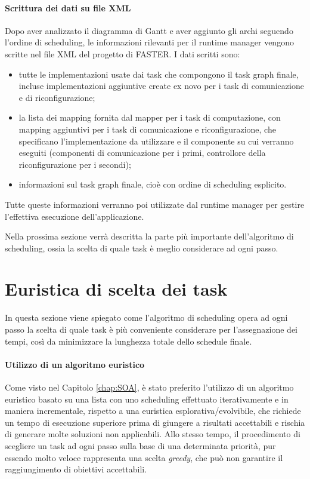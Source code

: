 \paragraph{Scrittura dei dati su file XML}
Dopo aver analizzato il diagramma di Gantt e aver aggiunto gli archi seguendo 
l'ordine di scheduling, le informazioni rilevanti per il runtime manager 
vengono scritte nel file XML del progetto di \ac{FASTER}. I dati scritti sono:
\begin{itemize}
 \item tutte le implementazioni usate dai task che compongono il task graph 
finale, incluse implementazioni aggiuntive create ex novo per i task di 
comunicazione e di riconfigurazione;
 \item la lista dei mapping fornita dal mapper per i task di computazione, con 
mapping aggiuntivi per i task di comunicazione e riconfigurazione, che 
specificano l'implementazione da utilizzare e il componente su cui verranno 
eseguiti (componenti di comunicazione per i primi, controllore della 
riconfigurazione per i secondi);
 \item informazioni sul task graph finale, cioè con ordine di scheduling 
esplicito.
\end{itemize}

Tutte queste informazioni verranno poi utilizzate dal runtime manager per 
gestire l'effettiva esecuzione dell'applicazione.

Nella prossima sezione verrà descritta la parte più importante dell'algoritmo 
di scheduling, ossia la scelta di quale task è meglio considerare ad ogni 
passo.


\section{Euristica di scelta dei task}
\label{sec:euristicaSceltaTask}
In questa sezione viene spiegato come l'algoritmo di scheduling opera ad ogni 
passo la scelta di quale task è più conveniente considerare per l'assegnazione 
dei tempi, così da minimizzare la lunghezza totale dello schedule finale.

\paragraph{Utilizzo di un algoritmo euristico}
Come visto nel Capitolo \ref{chap:SOA}, è stato preferito l'utilizzo di un 
algoritmo euristico basato su una lista con uno scheduling effettuato 
iterativamente e in maniera incrementale, rispetto a una euristica 
esplorativa/evolvibile, che richiede un tempo di esecuzione superiore prima di 
giungere a risultati accettabili e rischia di generare molte soluzioni non 
applicabili. Allo stesso tempo, il procedimento di scegliere un task ad ogni 
passo sulla base di una determinata priorità, pur essendo molto veloce 
rappresenta una scelta \emph{greedy}, che può non garantire il 
raggiungimento di obiettivi accettabili.

